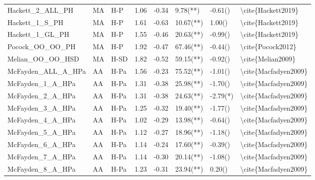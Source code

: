 \begin{tabular}{lllrrlll}
Hackett\_2\_ALL\_PH   &   MA &   H-P &              1.06 & -0.34 &                 9.78(**) &    -0.61() &    \textbackslash cite\{Hackett2019\} \\
Hackett\_1\_S\_PH     &   MA &   H-P &              1.61 & -0.63 &                10.67(**) &     1.00() &    \textbackslash cite\{Hackett2019\} \\
Hackett\_1\_GL\_PH    &   MA &   H-P &              1.55 & -0.46 &                20.63(**) &    -0.99() &    \textbackslash cite\{Hackett2019\} \\
Pocock\_OO\_OO\_PH    &   MA &   H-P &              1.92 & -0.47 &                67.46(**) &    -0.44() &     \textbackslash cite\{Pocock2012\} \\
Melian\_OO\_OO\_HSD   &   MA &  H-SD &              1.82 & -0.52 &                59.15(**) &    -0.92() &     \textbackslash cite\{Melian2009\} \\
McFayden\_ALL\_A\_HPa &   AA &  H-Pa &              1.56 & -0.23 &                75.52(**) &    -1.01() &  \textbackslash cite\{Macfadyen2009\} \\
McFayden\_1\_A\_HPa   &   AA &  H-Pa &              1.31 & -0.38 &                25.98(**) &    -1.70() &  \textbackslash cite\{Macfadyen2009\} \\
McFayden\_2\_A\_HPa   &   AA &  H-Pa &              1.31 & -0.38 &                24.63(**) &   -2.79(*) &  \textbackslash cite\{Macfadyen2009\} \\
McFayden\_3\_A\_HPa   &   AA &  H-Pa &              1.25 & -0.32 &                19.40(**) &    -1.77() &  \textbackslash cite\{Macfadyen2009\} \\
McFayden\_4\_A\_HPa   &   AA &  H-Pa &              1.02 & -0.29 &                13.98(**) &    -0.64() &  \textbackslash cite\{Macfadyen2009\} \\
McFayden\_5\_A\_HPa   &   AA &  H-Pa &              1.12 & -0.27 &                18.96(**) &    -1.18() &  \textbackslash cite\{Macfadyen2009\} \\
McFayden\_6\_A\_HPa   &   AA &  H-Pa &              1.14 & -0.24 &                17.60(**) &    -0.39() &  \textbackslash cite\{Macfadyen2009\} \\
McFayden\_7\_A\_HPa   &   AA &  H-Pa &              1.14 & -0.30 &                20.14(**) &    -1.08() &  \textbackslash cite\{Macfadyen2009\} \\
McFayden\_8\_A\_HPa   &   AA &  H-Pa &              1.23 & -0.31 &                23.94(**) &     0.20() &  \textbackslash cite\{Macfadyen2009\} \\

\end{tabular}
